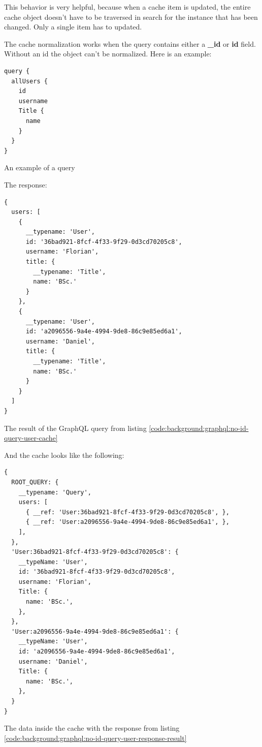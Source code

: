 This behavior is very helpful, because when a cache item is updated, the entire cache object doesn't have to be traversed in search for the instance that has been changed. Only a single item has to updated.

The cache normalization works when the query contains either a \textbf{\_id} or \textbf{id} field. Without an id the object can't be normalized. Here is an example:

\ifshowListings
\begin{listing}[H]
\begin{verbatim}
query {
  allUsers {
    id
    username
    Title {
      name
    }
  }
}
\end{verbatim}
\caption{An example of a query}\label{code:background:graphql:no-id-query-user-cache}
\end{listing}
\fi

The response: 

\ifshowListings
\begin{listing}[H]
\begin{verbatim}
{
  users: [
    {
      __typename: 'User',
      id: '36bad921-8fcf-4f33-9f29-0d3cd70205c8',
      username: 'Florian',
      title: {
        __typename: 'Title',
        name: 'BSc.'
      }
    }, 
    {
      __typename: 'User',
      id: 'a2096556-9a4e-4994-9de8-86c9e85ed6a1',
      username: 'Daniel',
      title: {
        __typename: 'Title',
        name: 'BSc.'
      }
    }
  ]
}
\end{verbatim}
\caption{The result of the GraphQL query from listing \ref{code:background:graphql:no-id-query-user-cache}}\label{code:background:graphql:no-id-query-user-response-result}
\end{listing}
\fi

And the cache looks like the following:

\ifshowListings
\begin{listing}[H]
\begin{verbatim}
{
  ROOT_QUERY: {
    __typename: 'Query',
    users: [
      { __ref: 'User:36bad921-8fcf-4f33-9f29-0d3cd70205c8', },
      { __ref: 'User:a2096556-9a4e-4994-9de8-86c9e85ed6a1', },
    ],
  },
  'User:36bad921-8fcf-4f33-9f29-0d3cd70205c8': {
    __typeName: 'User',
    id: '36bad921-8fcf-4f33-9f29-0d3cd70205c8',
    username: 'Florian',
    Title: {
      name: 'BSc.',
    },
  },
  'User:a2096556-9a4e-4994-9de8-86c9e85ed6a1': {
    __typeName: 'User',
    id: 'a2096556-9a4e-4994-9de8-86c9e85ed6a1',
    username: 'Daniel',
    Title: {
      name: 'BSc.',
    },
  }
}
\end{verbatim}
\caption{The data inside the cache with the response from listing \ref{code:background:graphql:no-id-query-user-response-result}}\label{code:background:graphql:no-id-query-user-cache-representation}
\end{listing}
\fi

